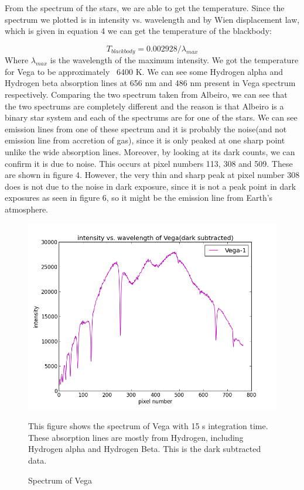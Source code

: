 \documentclass[letterpaper,12pt]{article}
\begin{document}
From the spectrum of the stars, we are able to get the temperature. Since the spectrum we plotted is in intensity vs. wavelength and by Wien displacement law, which is given in equation 4 we can get the temperature of the blackbody:

\begin{equation}
T_{blackbody}=0.002928/\lambda_{max}
\end{equation}
Where \begin{math} \lambda_{max} \end{math} is the wavelength of the maximum intensity.
We got the temperature for Vega to be approximately ~6400 K.
We can see some Hydrogen alpha and Hydrogen beta absorption lines at 656 nm and 486 nm present in Vega spectrum respectively.
Comparing the two spectrum taken from Albeiro, we can see that the two spectrums are completely different and the reason is that Albeiro is a binary star system and each of the spectrums are for one of the stars. We can see emission lines from one of these spectrum and it is probably the noise(and not emission line from accretion of gas), since it is only peaked at one sharp point unlike the wide absorption lines. Moreover, by looking at its dark counts, we can confirm it is due to noise. This occurs at pixel numbers 113, 308 and 509. These are shown in figure 4. However, the very thin and sharp peak at pixel number 308 does is not due to the noise in dark exposure, since it is not a peak point in dark exposures as seen in figure 6, so it might be the emission line from Earth's atmosphere.

\begin{figure}[H]
\centering
\includegraphics[scale=0.6]{vega-01-dark_subtracted.png}
\caption{Spectrum of Vega}
This figure shows the spectrum of Vega with 15 s integration time. These absorption lines are mostly from Hydrogen, including Hydrogen alpha and Hydrogen Beta. This is the dark subtracted data.
\end{figure}
\end{document}

